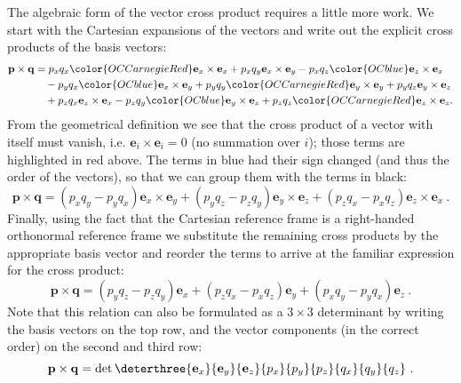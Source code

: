 \begin{itemize}
	The algebraic form of the vector cross product requires a little more work. We start with the Cartesian expansions of the vectors and write out the explicit cross products of the basis vectors:
	\begin{equation}
		\begin{split}
			\mathbf{p}\times\mathbf{q} 	&= p_xq_x {\color{OCCarnegieRed}\mathbf{e}_x\times\mathbf{e}_x} + p_xq_y \mathbf{e}_x\times\mathbf{e}_y-p_xq_z {\color{OCblue}\mathbf{e}_z\times\mathbf{e}_x}\\
									&\quad - p_yq_x {\color{OCblue}\mathbf{e}_x\times\mathbf{e}_y} + p_yq_y {\color{OCCarnegieRed}\mathbf{e}_y\times\mathbf{e}_y}+p_yq_z \mathbf{e}_y\times\mathbf{e}_z\\
									&\quad+ p_zq_x \mathbf{e}_z\times\mathbf{e}_x - p_zq_y {\color{OCblue}\mathbf{e}_y\times\mathbf{e}_z}+p_zq_z {\color{OCCarnegieRed}\mathbf{e}_z\times\mathbf{e}_z}.
		\end{split}
	\end{equation}
	From the geometrical definition we see that the cross product of a vector with itself must vanish, i.e. $\mathbf{e}_i\times\mathbf{e}_i=0$ (no summation over $i$); those terms are highlighted in red above.  The terms in blue had their sign changed (and thus the order of the vectors), so that we can group them with the terms in black:
	\begin{equation}
		\mathbf{p}\times\mathbf{q} = (p_xq_y- p_yq_x) \mathbf{e}_x\times\mathbf{e}_y+(p_yq_z-p_zq_y) \mathbf{e}_y\times\mathbf{e}_z+(p_zq_x-p_xq_z) \mathbf{e}_z\times\mathbf{e}_x\ .
	\end{equation}
	Finally, using the fact that the Cartesian reference frame is a right-handed orthonormal reference frame we substitute the remaining cross products by the appropriate basis vector and reorder the terms to arrive at the familiar expression for the cross product:
	\begin{equation}
		\mathbf{p}\times\mathbf{q} = (p_yq_z-p_zq_y) \mathbf{e}_x+(p_zq_x-p_xq_z) \mathbf{e}_y+(p_xq_y- p_yq_x) \mathbf{e}_z\ .
	\end{equation}
	Note that this relation can also be formulated as a $3\times 3$ determinant by writing the basis vectors on the top row, and the vector components (in the correct order) on the second and third row:
	\begin{equation}
		\mathbf{p}\times\mathbf{q} = \det\deterthree{\mathbf{e}_x}{\mathbf{e}_y}{ \mathbf{e}_z}{p_x}{p_y}{p_z}{q_x}{q_y}{q_z}\ . 
	\end{equation}
	
\end{itemize}

